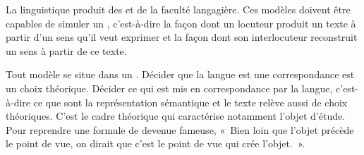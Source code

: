 La linguistique produit des   et de la faculté langagière. Ces modèles doivent être capables de simuler un , c’est-à-dire la façon dont un locuteur produit un texte à partir d’un sens qu’il veut exprimer et la façon dont son interlocuteur reconstruit un sens à partir de ce texte.

Tout modèle se situe dans un . Décider que la langue est une correspondance est un choix théorique. Décider ce qui est mis en correspondance par la langue, c’est-à-dire ce que sont la représentation sémantique et le texte relève aussi de choix théoriques. C’est le cadre théorique qui caractérise notamment l’objet d’étude. Pour reprendre une formule de \citet{Saussure1916} devenue fameuse, «~Bien loin que l’objet précède le point de vue, on dirait que c’est le point de vue qui crée l’objet.~».

